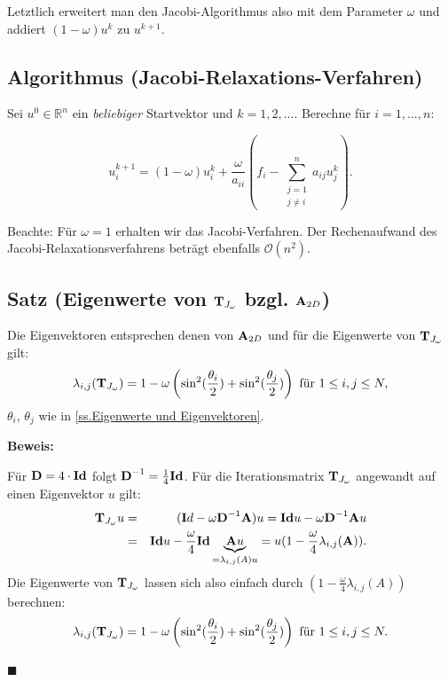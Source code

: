 Letztlich erweitert man den Jacobi-Algorithmus also mit dem Parameter $\omega$ und addiert $(1 - \omega)u^{k}$ zu $u^{k+1}$.

\subsection{Algorithmus (Jacobi-Relaxations-Verfahren)}\label{ss.Algorithmus Jacobi Relax}

Sei $u^{0} \in \mathbb{R}^{n}$ ein \textit{beliebiger} Startvektor und $k=1,2,...$. Berechne für $i=1,...,n$:

\begin{equation}
u^{k+1}_{i} = (1 - \omega)u^{k}_{i} + \frac {\omega} {a_{ii}} (f_{i} - \sum_{\substack{j = 1 \\ j \ne i}}^{n} a_{ij}u^{k}_{j}).
\end{equation}

Beachte: Für $\omega = 1$ erhalten wir das Jacobi-Verfahren. Der Rechenaufwand des Jacobi-Relaxationsverfahrens beträgt ebenfalls $\mathcal{O}(n^{2})$.

\subsection{Satz (Eigenwerte von ${\textbf{T}}_{J_{\omega}}$ bzgl. ${\textbf{A}}_{2D}$)}\label{ss.EW Relax}

Die Eigenvektoren entsprechen denen von ${\textbf{A}}_{2D}$ und für die Eigenwerte von ${\textbf{T}}_{J_{\omega}}$ gilt:
\begin{equation}
\lambda_{i,j}({\textbf{T}}_{J_{\omega}}) = 1 - \omega \left(\sin^{2}(\frac {\theta_{i}} {2}) + \sin^{2}(\frac {\theta_{j}} {2}) \right) \textnormal{ für } 1 \le i,j \le N,\label{eq.Jacobi-Relaxation-Eigenwerte}
\end{equation}
$\theta_{i}$, $\theta_{j}$ wie in \autoref{ss.Eigenwerte und Eigenvektoren}.

\textbf{Beweis:}\label{sss.EW JacobiRelax}

Für ${\textbf{D}} = 4 \cdot {\textbf{Id}}$ folgt ${\textbf{D}}^{-1} = \frac {1} {4} {\textbf{Id}}$. Für die Iterationsmatrix ${\textbf{T}}_{J_{\omega}}$ angewandt auf einen Eigenvektor $u$ gilt:
\begin{eqnarray}
{\textbf{T}}_{J_{\omega}}u &=& ({\textbf{I}}d - \omega {\textbf{D}}^{-1}{\textbf{A}})u = {\textbf{Id}} u - \omega {\textbf{D}}^{-1} {\textbf{A}} u \notag \\
&=&{\textbf{Id}} u - \frac {\omega} {4} {\textbf{Id}} \underbrace{{\textbf{A}}u}_{=\lambda_{i,j}(A) u} = u (1 - \frac {\omega} {4} \lambda_{i,j}({\textbf{A}})). \notag
\end{eqnarray}
Die Eigenwerte von ${\textbf{T}}_{J_{\omega}}$ lassen sich also einfach durch $(1 - \frac {\omega} {4} \lambda_{i,j}(A))$ berechnen:
\begin{equation}
\lambda_{i,j}({\textbf{T}}_{J_{\omega}}) = 1 - \omega \left(\sin^{2}(\frac {\theta_{i}} {2}) + \sin^{2}(\frac {\theta_{j}} {2}) \right) \textnormal{ für } 1 \le i,j \le N. \notag
\end{equation}
\begin{flushright}
$\blacksquare$
\end{flushright}

